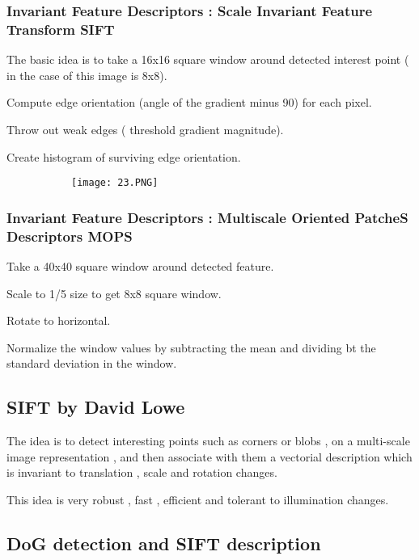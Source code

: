 \documentclass{article}
\begin{document}
\subsubsection{Invariant Feature Descriptors : Scale Invariant Feature Transform SIFT}

The basic idea is to take a 16x16 square window around detected interest point ( in the case of this image is 8x8).

Compute edge orientation (angle of the gradient minus 90) for each pixel.

Throw out weak edges ( threshold gradient magnitude).

Create histogram of surviving edge orientation.

\begin{figure}[ht!]
  \centering
  \begin{subfigure}[b]{0.7\linewidth}
    \texttt{[image: 23.PNG]}
  \end{subfigure}
\end{figure}

\subsubsection{Invariant Feature Descriptors : Multiscale Oriented PatcheS Descriptors MOPS}

Take a 40x40 square window around detected feature.

Scale to 1/5 size to get 8x8 square window.

Rotate to horizontal.

Normalize the window values by subtracting the mean and dividing bt the standard deviation in the window.

\subsection{SIFT by David Lowe}

The idea is to detect interesting points such as corners or blobs , on a multi-scale image representation , and then associate with them a vectorial description which is invariant to translation , scale and rotation changes.

This idea is very robust , fast , efficient and tolerant to illumination changes.

\subsection{DoG detection and SIFT description}
\end{document}
